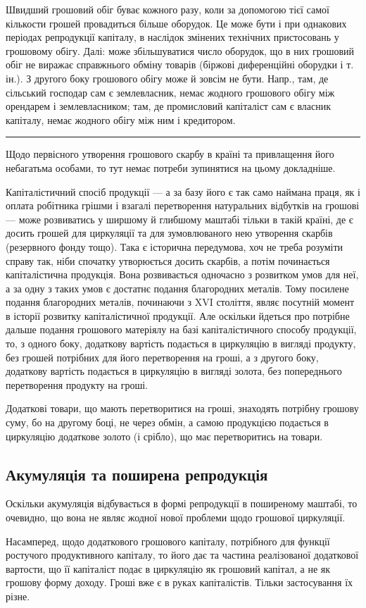 Швидший грошовий обіг буває кожного разу, коли за допомогою тієї
самої кількости грошей провадиться більше оборудок. Це може бути і
при однакових періодах репродукції капіталу, в наслідок змінених технічних
пристосовань у грошовому обігу. Далі: може збільшуватися число
оборудок, що в них грошовий обіг не виражає справжнього обміну товарів
(біржові диференційні оборудки і т. ін.). З другого боку грошового
обігу може й зовсім не бути. Напр., там, де сільський господар сам є
землевласник, немає жодного грошового обігу між орендарем і землевласником;
там, де промисловий капіталіст сам є власник капіталу, немає
жодного обігу між ним і кредитором.
\pfbreak
Щодо первісного утворення грошового скарбу в країні та привлащення
його небагатьма особами, то тут немає потреби зупинятися на
цьому докладніше.

Капіталістичний спосіб продукції — а за базу його є так само наймана
праця, як і оплата робітника грішми і взагалі перетворення натуральних
відбутків на грошові — може розвиватись у ширшому й глибшому маштабі
тільки в такій країні, де є досить грошей для циркуляції та для
зумовлюваного нею утворення скарбів (резервного фонду тощо). Така є
історична передумова, хоч не треба розуміти справу так, ніби спочатку
утворюється досить скарбів, а потім починається капіталістична продукція.
Вона розвивається одночасно з розвитком умов для неї, а за одну з
таких умов є достатнє подання благородних металів. Тому посилене подання
благородних металів, починаючи з XVI століття, являє посутній
момент в історії розвитку капіталістичної продукції. Але оскільки йдеться
про потрібне дальше подання грошового матеріялу на базі капіталістичного
способу продукції, то, з одного боку, додаткову вартість
подається в циркуляцію в вигляді продукту, без грошей потрібних для
його перетворення на гроші, а з другого боку, додаткову вартість подається
в циркуляцію в вигляді золота, без попереднього перетворення
продукту на гроші.

Додаткові товари, що мають перетворитися на гроші, знаходять потрібну
грошову суму, бо на другому боці, не через обмін, а самою продукцією
подається в циркуляцію додаткове золото (і срібло), що має
перетворитись на товари.

\subsection{Акумуляція та поширена репродукція}

Оскільки акумуляція відбувається в формі репродукції в поширеному
маштабі, то очевидно, що вона не являє жодної нової проблеми щодо грошової
циркуляції.

Насамперед, щодо додаткового грошового капіталу, потрібного для
функції ростучого продуктивного капіталу, то його дає та частина реалізованої
додаткової вартости, що її капіталіст подає в циркуляцію як грошовий
капітал, а не як грошову форму доходу. Гроші вже є в руках
капіталістів. Тільки застосування їх різне.
